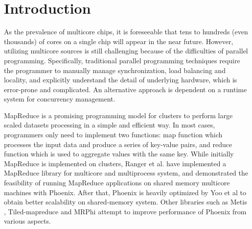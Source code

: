 \section{Introduction}
\label{sec:intro}



As the prevalence of multicore chips, it is foreseeable that tens to hundreds (even thousands) of cores on a single chip will appear in the near future\cite{Borkar2007core}.
However, utilizing multicore sources is still challenging because of the difficulties of parallel programming.
Specifically, traditional parallel programming techniques require the programmer to manually manage synchronization, load balancing and locality, and explicitly understand the detail of underlying hardware, which is error-prone and complicated. %
An alternative approach is dependent on a runtime system for concurrency management. 

MapReduce\cite{dean2004mapreduce} is a promising programming model for clusters to perform large scaled datasets processing in a simple and efficient way.
In most cases, programmers only need to implement two functions: 
map function which processes the input data and produce  a series of key-value pairs, and reduce function which is used to aggregate values with the same key.
While initially MapReduce is implemented on clusters, Ranger et al. have implemented a MapReduce library for multicore and multiprocess system, and demonstrated the feasibility of running MapReduce applications on shared memory multicore machines with Phoenix\cite{ranger2007phoenix}.
After that, Phoenix is heavily optimized by Yoo et al\cite{yoo2009phoenix2} to obtain better scalability on shared-memory system.
Other libraries such as Metis\cite{mao2010metis} , Tiled-mapreduce\cite{chen2010tiled} and MRPhi\cite{lu2013mrphi} attempt to improve performance of Phoenix from various aspects.


